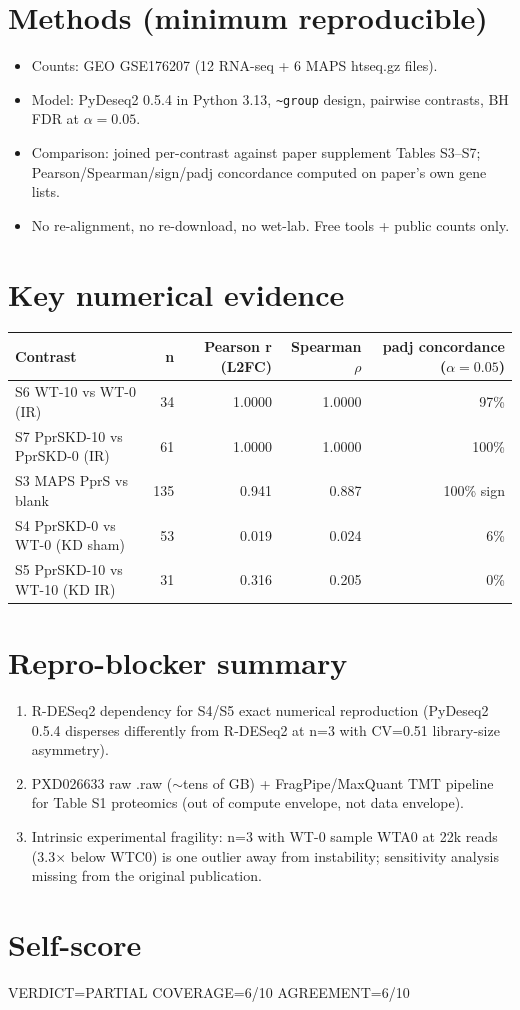 \documentclass[11pt]{article}
\begin{document}
\section*{Methods (minimum reproducible)}
\begin{itemize}
  \item Counts: GEO GSE176207 (12 RNA-seq + 6 MAPS htseq.gz files).
  \item Model: PyDeseq2 0.5.4 in Python 3.13, \texttt{\~{}group} design, pairwise contrasts, BH FDR at $\alpha=0.05$.
  \item Comparison: joined per-contrast against paper supplement Tables S3--S7; Pearson/Spearman/sign/padj concordance computed on paper's own gene lists.
  \item No re-alignment, no re-download, no wet-lab. Free tools + public counts only.
\end{itemize}

\section*{Key numerical evidence}
\begin{longtable}{lrrrr}
\toprule
Contrast & n & Pearson r (L2FC) & Spearman $\rho$ & padj concordance ($\alpha=0.05$) \\
\midrule
\endhead
S6 WT-10 vs WT-0 (IR) & 34 & 1.0000 & 1.0000 & 97\% \\
S7 PprSKD-10 vs PprSKD-0 (IR) & 61 & 1.0000 & 1.0000 & 100\% \\
S3 MAPS PprS vs blank & 135 & 0.941 & 0.887 & 100\% sign \\
S4 PprSKD-0 vs WT-0 (KD sham) & 53 & 0.019 & 0.024 & 6\% \\
S5 PprSKD-10 vs WT-10 (KD IR) & 31 & 0.316 & 0.205 & 0\% \\
\bottomrule
\end{longtable}

\section*{Repro-blocker summary}
\begin{enumerate}
  \item R-DESeq2 dependency for S4/S5 exact numerical reproduction (PyDeseq2 0.5.4 disperses differently from R-DESeq2 at n=3 with CV=0.51 library-size asymmetry).
  \item PXD026633 raw .raw ($\sim$tens of GB) + FragPipe/MaxQuant TMT pipeline for Table S1 proteomics (out of compute envelope, not data envelope).
  \item Intrinsic experimental fragility: n=3 with WT-0 sample WTA0 at 22k reads (3.3$\times$ below WTC0) is one outlier away from instability; sensitivity analysis missing from the original publication.
\end{enumerate}

\section*{Self-score}
VERDICT=PARTIAL COVERAGE=6/10 AGREEMENT=6/10


\end{document}
